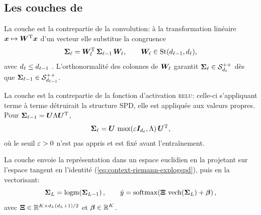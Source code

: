 \subsection{Les couches de \SPDnet}
\label{sec:spdnet-couches}

\begin{definition}
\label{def:spdnet-bimap}
  La couche \BiMap{} est la contrepartie de la convolution: à la transformation
  linéaire $\boldsymbol{x}\mapsto\boldsymbol{W}^{\mathrm{T}}\boldsymbol{x}$ d'un vecteur elle substitue la congruence
  \begin{equation}
    \boldsymbol{\Sigma}_\ell
    =
    \boldsymbol{W}_\ell^{\mathrm{T}}\,\boldsymbol{\Sigma}_{\ell-1}\,\boldsymbol{W}_\ell,
    \qquad
    \boldsymbol{W}_\ell\in\mathrm{St}(d_{\ell-1},d_{\ell}),
    \label{eq:spdnet-bimap}
  \end{equation}
  avec $d_{\ell}\leq d_{\ell-1}$ .
  L'orthonormalité des colonnes de $\boldsymbol{W}_\ell$ garantit
  $\boldsymbol{\Sigma}_\ell\in\mathcal{S}_{d_{\ell}}^{++}$ dès que $\boldsymbol{\Sigma}_{\ell-1}\in\mathcal{S}_{d_{\ell-1}}^{++}$.
\end{definition}

\begin{definition}
\label{def:spdnet-reeig}
  La couche \ReEig{} est la contrepartie de la fonction d'activation \textsc{relu}:
  celle-ci s'appliquant terme à terme détruirait la structure SPD, elle est
  appliquée aux valeurs propres. Pour $\boldsymbol{\Sigma}_{\ell-1}=\boldsymbol{U}\Lambda\boldsymbol{U}^{\mathrm{T}}$,
  \begin{equation}
    \boldsymbol{\Sigma}_\ell
    =
    \boldsymbol{U}\,\max\!\left(\varepsilon\boldsymbol{I}_{d_{\ell}},\Lambda\right)\boldsymbol{U}^{\mathrm{T}},
    \label{eq:spdnet-reeig}
  \end{equation}
  où le seuil $\varepsilon>0$ n'est pas appris et est fixé avant l'entraînement.
\end{definition}

\begin{definition}
\label{def:spdnet-logeig}
  La couche \LogEig{} envoie la représentation dans un espace euclidien en la
  projetant sur l'espace tangent en l'identité
  (\cref{eq:context-riemann-explogspd}), puis en la vectorisant:
  \begin{equation}
    \boldsymbol{\Sigma}_{L}
    =
    \operatorname{\operatorname{logm}}\!\left(\boldsymbol{\Sigma}_{L-1}\right),
    \qquad
    \hat{y}
    =
    \operatorname{\operatorname{softmax}}\!\left(\boldsymbol{\Xi}\,\operatorname{\operatorname{vech}}(\boldsymbol{\Sigma}_{L})+\boldsymbol{\beta}\right),
    \label{eq:spdnet-logeig}
  \end{equation}
  avec $\boldsymbol{\Xi}\in\mathbb{R}^{K\times d_{L}(d_{L}+1)/2}$ et
  $\boldsymbol{\beta}\in\mathbb{R}^{K}$.
\end{definition}

